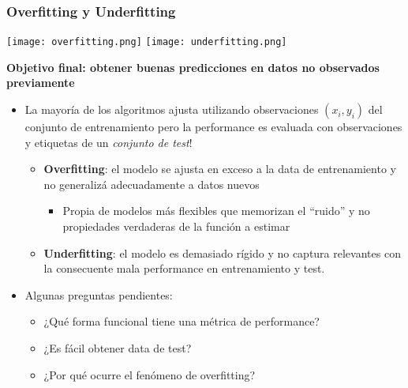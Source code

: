 \documentclass[leqno, 10pt, envcountsect]{beamer}
\numberwithin{equation}{section}
\theoremstyle{definition}
\theoremstyle{example}
\numberwithin{figure}{section}
\numberwithin{table}{section}
\let\olditem\item
\renewcommand{\item}{%
\olditem\vspace{1pt}}
\begin{document}
\begin{frame}[fragile=singleslide]
  \frametitle{Overfitting y Underfitting}
  \begin{center}
    \texttt{[image: overfitting.png]}
    \texttt{[image: underfitting.png]}
  \end{center}
    \textbf{Objetivo final: obtener buenas predicciones en datos no observados previamente}
      \begin{itemize}
        \item La mayoría de los algoritmos ajusta utilizando observaciones
          $(x_{i}, y_{i})$ del conjunto de entrenamiento pero la performance es
          evaluada con observaciones y etiquetas de un \textit{conjunto de test}!
      \begin{itemize}
            \item \textbf{Overfitting}: el modelo se ajusta en exceso a la data
              de entrenamiento y no generalizá adecuadamente a datos nuevos
              \begin{itemize}
                \item Propia de modelos más flexibles que memorizan el
                  \enquote{ruido} y no propiedades verdaderas de la función a
                  estimar
              \end{itemize}
            \item \textbf{Underfitting}: el modelo es demasiado rígido y no
              captura relevantes con la consecuente mala performance en
              entrenamiento y test.
        \end{itemize}
    \item Algunas preguntas pendientes:
      \begin{itemize}
    \item ¿Qué forma funcional tiene una métrica de performance?
    \item ¿Es fácil obtener data de test?
    \item ¿Por qué ocurre el fenómeno de overfitting?
      \end{itemize}
  \end{itemize}
\end{frame}
\end{document}
